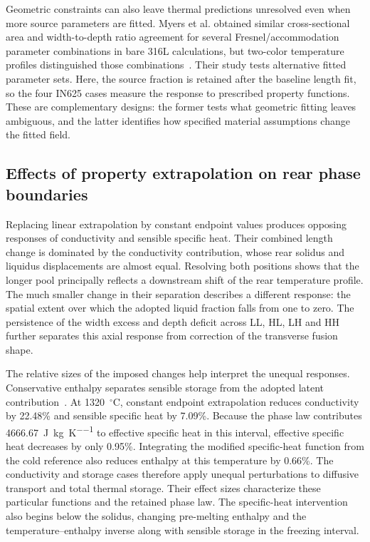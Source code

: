 Geometric constraints can also leave thermal predictions unresolved even when more source parameters are fitted. Myers et al. obtained similar cross-sectional area and width-to-depth ratio agreement for several Fresnel/accommodation parameter combinations in bare 316L calculations, but two-color temperature profiles distinguished those combinations~\cite{myers2023}. Their study tests alternative fitted parameter sets. Here, the source fraction is retained after the baseline length fit, so the four IN625 cases measure the response to prescribed property functions. These are complementary designs: the former tests what geometric fitting leaves ambiguous, and the latter identifies how specified material assumptions change the fitted field.

\subsection{Effects of property extrapolation on rear phase boundaries}
Replacing linear extrapolation by constant endpoint values produces opposing responses of conductivity and sensible specific heat. Their combined length change is dominated by the conductivity contribution, whose rear solidus and liquidus displacements are almost equal. Resolving both positions shows that the longer pool principally reflects a downstream shift of the rear temperature profile. The much smaller change in their separation describes a different response: the spatial extent over which the adopted liquid fraction falls from one to zero. The persistence of the width excess and depth deficit across LL, HL, LH and HH further separates this axial response from correction of the transverse fusion shape.

The relative sizes of the imposed changes help interpret the unequal responses. Conservative enthalpy separates sensible storage from the adopted latent contribution~\cite{vanelsen2007}. At 1320~$^\circ$C, constant endpoint extrapolation reduces conductivity by 22.48\% and sensible specific heat by 7.09\%. Because the phase law contributes 4666.67~\si{\joule\per\kilogram\per\kelvin} to effective specific heat in this interval, effective specific heat decreases by only 0.95\%. Integrating the modified specific-heat function from the cold reference also reduces enthalpy at this temperature by 0.66\%. The conductivity and storage cases therefore apply unequal perturbations to diffusive transport and total thermal storage. Their effect sizes characterize these particular functions and the retained phase law. The specific-heat intervention also begins below the solidus, changing pre-melting enthalpy and the temperature--enthalpy inverse along with sensible storage in the freezing interval.

